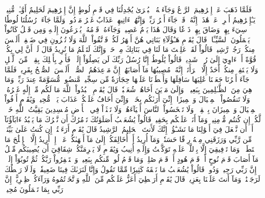 فَلَمَّا ذَهَبَ عَنۡ إِبۡرَٰهِيمَ ٱلرَّوۡعُ وَجَآءَتۡهُ ٱلۡبُشۡرَىٰ يُجَٰدِلُنَا فِي قَوۡمِ لُوطٍ
إِنَّ إِبۡرَٰهِيمَ لَحَلِيمٌ أَوَّـٰهٞ مُّنِيبٞ
يَـٰٓإِبۡرَٰهِيمُ أَعۡرِضۡ عَنۡ هَٰذَآۖ إِنَّهُۥ قَدۡ جَآءَ أَمۡرُ رَبِّكَۖ وَإِنَّهُمۡ ءَاتِيهِمۡ عَذَابٌ غَيۡرُ مَرۡدُودٖ
وَلَمَّا جَآءَتۡ رُسُلُنَا لُوطٗا سِيٓءَ بِهِمۡ وَضَاقَ بِهِمۡ ذَرۡعٗا وَقَالَ هَٰذَا يَوۡمٌ عَصِيبٞ
وَجَآءَهُۥ قَوۡمُهُۥ يُهۡرَعُونَ إِلَيۡهِ وَمِن قَبۡلُ كَانُواْ يَعۡمَلُونَ ٱلسَّيِّـَٔاتِۚ قَالَ يَٰقَوۡمِ هَـٰٓؤُلَآءِ بَنَاتِي هُنَّ أَطۡهَرُ لَكُمۡۖ فَٱتَّقُواْ ٱللَّهَ وَلَا تُخۡزُونِ فِي ضَيۡفِيٓۖ أَلَيۡسَ مِنكُمۡ رَجُلٞ رَّشِيدٞ
قَالُواْ لَقَدۡ عَلِمۡتَ مَا لَنَا فِي بَنَاتِكَ مِنۡ حَقّٖ وَإِنَّكَ لَتَعۡلَمُ مَا نُرِيدُ
قَالَ لَوۡ أَنَّ لِي بِكُمۡ قُوَّةً أَوۡ ءَاوِيٓ إِلَىٰ رُكۡنٖ شَدِيدٖ
قَالُواْ يَٰلُوطُ إِنَّا رُسُلُ رَبِّكَ لَن يَصِلُوٓاْ إِلَيۡكَۖ فَأَسۡرِ بِأَهۡلِكَ بِقِطۡعٖ مِّنَ ٱلَّيۡلِ وَلَا يَلۡتَفِتۡ مِنكُمۡ أَحَدٌ إِلَّا ٱمۡرَأَتَكَۖ إِنَّهُۥ مُصِيبُهَا مَآ أَصَابَهُمۡۚ إِنَّ مَوۡعِدَهُمُ ٱلصُّبۡحُۚ أَلَيۡسَ ٱلصُّبۡحُ بِقَرِيبٖ
فَلَمَّا جَآءَ أَمۡرُنَا جَعَلۡنَا عَٰلِيَهَا سَافِلَهَا وَأَمۡطَرۡنَا عَلَيۡهَا حِجَارَةٗ مِّن سِجِّيلٖ مَّنضُودٖ
مُّسَوَّمَةً عِندَ رَبِّكَۖ وَمَا هِيَ مِنَ ٱلظَّـٰلِمِينَ بِبَعِيدٖ
۞وَإِلَىٰ مَدۡيَنَ أَخَاهُمۡ شُعَيۡبٗاۚ قَالَ يَٰقَوۡمِ ٱعۡبُدُواْ ٱللَّهَ مَا لَكُم مِّنۡ إِلَٰهٍ غَيۡرُهُۥۖ وَلَا تَنقُصُواْ ٱلۡمِكۡيَالَ وَٱلۡمِيزَانَۖ إِنِّيٓ أَرَىٰكُم بِخَيۡرٖ وَإِنِّيٓ أَخَافُ عَلَيۡكُمۡ عَذَابَ يَوۡمٖ مُّحِيطٖ
وَيَٰقَوۡمِ أَوۡفُواْ ٱلۡمِكۡيَالَ وَٱلۡمِيزَانَ بِٱلۡقِسۡطِۖ وَلَا تَبۡخَسُواْ ٱلنَّاسَ أَشۡيَآءَهُمۡ وَلَا تَعۡثَوۡاْ فِي ٱلۡأَرۡضِ مُفۡسِدِينَ
بَقِيَّتُ ٱللَّهِ خَيۡرٞ لَّكُمۡ إِن كُنتُم مُّؤۡمِنِينَۚ وَمَآ أَنَا۠ عَلَيۡكُم بِحَفِيظٖ
قَالُواْ يَٰشُعَيۡبُ أَصَلَوٰتُكَ تَأۡمُرُكَ أَن نَّتۡرُكَ مَا يَعۡبُدُ ءَابَآؤُنَآ أَوۡ أَن نَّفۡعَلَ فِيٓ أَمۡوَٰلِنَا مَا نَشَـٰٓؤُاْۖ إِنَّكَ لَأَنتَ ٱلۡحَلِيمُ ٱلرَّشِيدُ
قَالَ يَٰقَوۡمِ أَرَءَيۡتُمۡ إِن كُنتُ عَلَىٰ بَيِّنَةٖ مِّن رَّبِّي وَرَزَقَنِي مِنۡهُ رِزۡقًا حَسَنٗاۚ وَمَآ أُرِيدُ أَنۡ أُخَالِفَكُمۡ إِلَىٰ مَآ أَنۡهَىٰكُمۡ عَنۡهُۚ إِنۡ أُرِيدُ إِلَّا ٱلۡإِصۡلَٰحَ مَا ٱسۡتَطَعۡتُۚ وَمَا تَوۡفِيقِيٓ إِلَّا بِٱللَّهِۚ عَلَيۡهِ تَوَكَّلۡتُ وَإِلَيۡهِ أُنِيبُ
وَيَٰقَوۡمِ لَا يَجۡرِمَنَّكُمۡ شِقَاقِيٓ أَن يُصِيبَكُم مِّثۡلُ مَآ أَصَابَ قَوۡمَ نُوحٍ أَوۡ قَوۡمَ هُودٍ أَوۡ قَوۡمَ صَٰلِحٖۚ وَمَا قَوۡمُ لُوطٖ مِّنكُم بِبَعِيدٖ
وَٱسۡتَغۡفِرُواْ رَبَّكُمۡ ثُمَّ تُوبُوٓاْ إِلَيۡهِۚ إِنَّ رَبِّي رَحِيمٞ وَدُودٞ
قَالُواْ يَٰشُعَيۡبُ مَا نَفۡقَهُ كَثِيرٗا مِّمَّا تَقُولُ وَإِنَّا لَنَرَىٰكَ فِينَا ضَعِيفٗاۖ وَلَوۡلَا رَهۡطُكَ لَرَجَمۡنَٰكَۖ وَمَآ أَنتَ عَلَيۡنَا بِعَزِيزٖ
قَالَ يَٰقَوۡمِ أَرَهۡطِيٓ أَعَزُّ عَلَيۡكُم مِّنَ ٱللَّهِ وَٱتَّخَذۡتُمُوهُ وَرَآءَكُمۡ ظِهۡرِيًّاۖ إِنَّ رَبِّي بِمَا تَعۡمَلُونَ مُحِيطٞ
